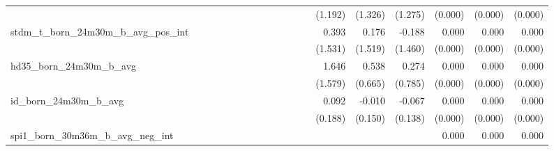 \begin{tabular}{lrrrrrrrrrrrrrrrrrr}
                                            &              &              &              &              &              &              &              &              &               &              &              &               &      (1.192) &      (1.326) &       (1.275) &      (0.000) &      (0.000) &       (0.000) \\ 
stdm\_t\_born\_24m30m\_b\_avg\_pos\_int     &              &              &              &              &              &              &              &              &               &              &              &               &        0.393 &        0.176 &        -0.188 &        0.000 &        0.000 &         0.000 \\ 
                                            &              &              &              &              &              &              &              &              &               &              &              &               &      (1.531) &      (1.519) &       (1.460) &      (0.000) &      (0.000) &       (0.000) \\ 
hd35\_born\_24m30m\_b\_avg                  &              &              &              &              &              &              &              &              &               &              &              &               &        1.646 &        0.538 &         0.274 &        0.000 &        0.000 &         0.000 \\ 
                                            &              &              &              &              &              &              &              &              &               &              &              &               &      (1.579) &      (0.665) &       (0.785) &      (0.000) &      (0.000) &       (0.000) \\ 
id\_born\_24m30m\_b\_avg                    &              &              &              &              &              &              &              &              &               &              &              &               &        0.092 &       -0.010 &        -0.067 &        0.000 &        0.000 &         0.000 \\ 
                                            &              &              &              &              &              &              &              &              &               &              &              &               &      (0.188) &      (0.150) &       (0.138) &      (0.000) &      (0.000) &       (0.000) \\ 
spi1\_born\_30m36m\_b\_avg\_neg\_int        &              &              &              &              &              &              &              &              &               &              &              &               &              &              &               &        0.000 &        0.000 &         0.000 \\ 

\end{tabular}
